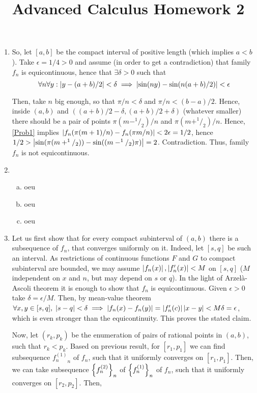 \documentclass[10pt]{article} %
\title{Advanced Calculus Homework 2}
\author{}
\begin{document}
\maketitle
\begin{enumerate}[(1)]
	\item So, let $[a,b]$ be the compact interval of positive length (which implies $a<b$). Take $\epsilon=1/4>0$ and assume
		(in order to get a contradiction) that family $f_n$ is equicontinuous, hence that $\exists\delta>0$ such that 
		\begin{equation}\forall n\forall y:\left|y-(a+b)/2\right|<\delta\implies
			\left|\sin(ny)-\sin(n(a+b)/2)\right|<\epsilon\label{Prob1}\end{equation}
		
		Then, take $n$ big enough, so that $\pi/n<\delta$ and $\pi/n<(b-a)/2$. Hence, inside $(a,b)$ and $((a+b)/2-\delta,
		(a+b)/2+\delta)$ (whatever smaller) there should be a pair of points $\pi (m-^1/_2)/n$ and $\pi(m+^1/_2)/n$. Hence, 
		\ref{Prob1} implies $\left|f_n(\pi(m+1)/n)-f_n(\pi m/n)\right|<2\epsilon=1/2$, hence
		$1/2>\left|\sin(\pi(m+^1/_2))-\sin((m-^1/_2)\pi)\right|=2$. Contradiction. Thus, family $f_n$ is not equicontinuous.
	\setcounter{enumi}{3}
\item\begin{enumerate}[(a)]
		\item oeu
		\item oeu
		\item oeu
	\end{enumerate}
\item Let us first show that for every compact subinterval of $(a,b)$ there is a subsequence of $f_n$, that converges
	uniformly on it. Indeed, let $[s,q]$ be such an interval. As restrictions of continuous functions $F$ and $G$ to compact
	subinterval are bounded, we may assume $\left|f_n(x)\right|,\left|f_n'(x)\right|<M$ on $[s,q]$ ($M$ independent on $x$ and $n$,
	but may depend on $s$ or $q$). In the light of Arzel\`a-Ascoli theorem it is enough to show that $f_n$ is equicontinuous.
	Given $\epsilon>0$ take $\delta=\epsilon/M$. Then, by mean-value theorem $\forall x,y\in[s,q],\;\left|s-q\right|<\delta\implies
	\left|f_n(x)-f_n(y)\right|=\left|f_n'(c)\right|\left|x-y\right|<M\delta=\epsilon$, which is even stronger than the equicontinuity. This 
	proves the stated claim.

	Now, let $(r_k,p_k)$ be the enumeration of pairs of rational points in $(a,b)$, such that $r_k<p_k$. Based on previous
	result, for $[r_1,p_1]$ we can find subsequence ${f^{(1)}_n}_n$ of $f_n$, such that it uniformly converges on $[r_1,p_1]$. Then,
	we can take subsequence $\left\{
	f^{(2)}_n\right\}_n$ of $\left\{f^{(1)}_n\right\}_n$ of $f_n$, such that it uniformly converges on $[r_2,p_2]$. Then,
	

\end{enumerate}
\end{document}
